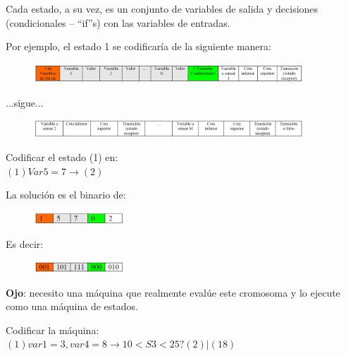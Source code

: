 Cada estado, a su vez, es un conjunto de variables de salida y decisiones (condicionales – “if”s) con las
variables de entradas.



Por ejemplo, el estado 1 se codificaría de la siguiente manera:

\begin{figure}[h!]
	\centering
	\includegraphics[width=0.9\textwidth]{images/img88.png}
	\label{figura88}
\end{figure}

...sigue...

\begin{figure}[h!]
	\centering
	\includegraphics[width=0.9\textwidth]{images/img89.png}
	\label{figura89}
\end{figure}

\begin{ejemplo}
Codificar el estado (1) en: \\
$(1) Var5 = 7 \rightarrow (2)$
\end{ejemplo}

La solución es el binario de:

\begin{figure}[h!]

	\includegraphics[width=0.3\textwidth]{images/img90.png}
	\label{figura90}
\end{figure}

Es decir: 

\begin{figure}[h!]
	
	\includegraphics[width=0.3\textwidth]{images/img91.png}
	\label{figura91}
\end{figure}

\textbf{Ojo}: necesito una máquina que realmente evalúe este cromosoma y lo ejecute como una máquina de estados.

\begin{ejemplo}
	Codificar la máquina: \\
	$ (1) var1 = 3, var4 = 8 \rightarrow 10 < S3 < 25 ? (2) | (18)$
\end{ejemplo}

